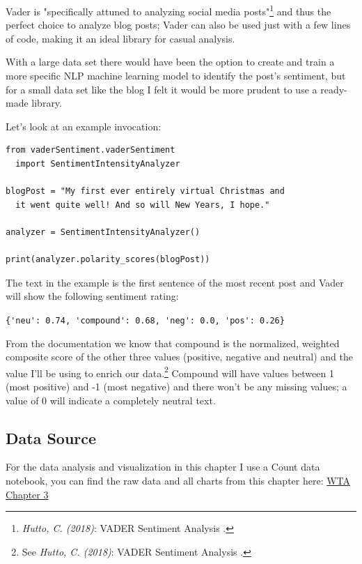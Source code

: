 Vader is "specifically attuned to analyzing social media posts"\footnote{\textit{Hutto, C. (2018)}: VADER Sentiment Analysis .\cite{vaderReadme}} and thus the perfect choice to analyze blog posts; Vader can also be used just with a few lines of code, making it an ideal library for casual analysis. 

With a large data set there would have been the option to create and train a more specific NLP machine learning model to identify the post's sentiment, but for a small data set like the blog I felt it would be more prudent to use a ready-made library.

Let's look at an example invocation:

\begin{lstlisting}[caption=Vader Example, frame=single, basicstyle=\ttfamily]
from vaderSentiment.vaderSentiment 
  import SentimentIntensityAnalyzer

blogPost = "My first ever entirely virtual Christmas and 
  it went quite well! And so will New Years, I hope."

analyzer = SentimentIntensityAnalyzer()

print(analyzer.polarity_scores(blogPost))

\end{lstlisting}

The text in the example is the first sentence of the most recent post and Vader will show the following sentiment rating:

\verb|{'neu': 0.74, 'compound': 0.68, 'neg': 0.0, 'pos': 0.26}|

From the documentation we know that compound is the normalized, weighted composite score of the other three values (positive, negative and neutral) and the value I'll be using to enrich our data.\footnote{See \textit{Hutto, C. (2018)}: VADER Sentiment Analysis .\cite{vaderReadme}} Compound will have values between 1 (most positive) and -1 (most negative) and there won't be any missing values; a value of 0 will indicate a completely neutral text.

\subsection{Data Source}

For the data analysis and visualization in this chapter I use a Count data notebook, you can find the raw data and all charts from this chapter here: \href{https://count.co/n/6WKuBzDV4Qq}{WTA Chapter 3}
